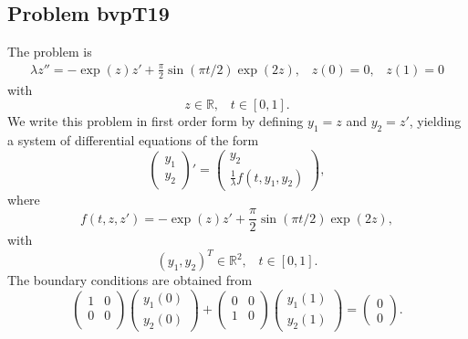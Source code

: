 \documentclass[<options>]{article}
\def \RR {{\mathbb{R}}}
\begin{document}
\subsection{Problem bvpT19}\label{test19}
The problem is
\begin{eqnarray*}
\lambda z'' =  -\exp(z) z' + \frac{\displaystyle{\pi}}{\displaystyle{2}} \sin(\pi t / 2) \exp(2z), \;\;\;z(0) = 0, \;\;\; z(1) =0
\end{eqnarray*}
with
\[
z \in \RR, \;\;\; t\in [0,1].
\]
We write this problem in first order form by defining $y_1=z$ and $y_2=z'$, yielding a system of differential equations of the form
\begin{equation*}
\left(\begin{array}{c}
y_1\\
y_2
\end{array}\right)'=
\left(\begin{array}{c}
y_2\\
\frac{1}{\lambda}f(t,y_1,y_2)
\end{array}\right),
\end{equation*}
where
\begin{equation*}
f(t,z,z') = -\exp(z) z' + \frac{\displaystyle{\pi}}{\displaystyle{2}} \sin(\pi t / 2) \exp(2z),
\end{equation*}
with
\[
(y_1,y_2)^T \in \RR^{2}, \;\;\;  t \in [0,1].
\]
The  boundary conditions are obtained from
\begin{equation*}
\left(
  \begin{array}{cc}
    1 & 0 \\
    0 & 0 \\
  \end{array}
\right)
\left(\begin{array}{c}
y_{1}(0)\\
y_{2}(0)
\end{array}\right)
+
\left(
  \begin{array}{cc}
    0 & 0 \\
    1 & 0 \\
  \end{array}
\right)
\left(\begin{array}{c}
y_{1}(1)\\
y_{2}(1)
\end{array}\right)=\left(\begin{array}{c}
0\\
0
\end{array}\right).
\end{equation*}
\end{document}
